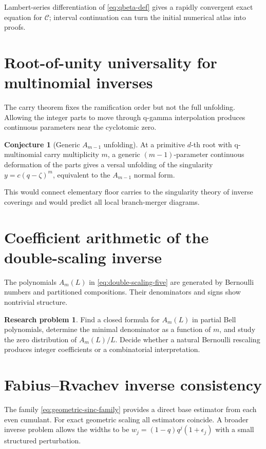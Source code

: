 \documentclass[11pt,letterpaper,oneside,openany]{book}
\theoremstyle{definition}
\newtheorem{researchproblem}{Research problem}[chapter]
\newtheorem{conjecture}{Conjecture}[chapter]
\theoremstyle{remark}
\begin{document}
Lambert-series differentiation of \cref{eq:qbeta-def} gives a rapidly
convergent exact equation for \(\mathcal C\); interval continuation can turn the
initial numerical atlas into proofs.

\section{Root-of-unity universality for multinomial inverses}
The carry theorem fixes the ramification order but not the full unfolding.
Allowing the integer parts to move through q-gamma interpolation produces
continuous parameters near the cyclotomic zero.

\begin{conjecture}[Generic \(A_{m-1}\) unfolding]
At a primitive \(d\)-th root with q-multinomial carry multiplicity \(m\), a
generic \((m-1)\)-parameter continuous deformation of the parts gives a
versal unfolding of the singularity \(y=c(q-\zeta)^m\), equivalent to the
\(A_{m-1}\) normal form.
\end{conjecture}

This would connect elementary floor carries to the singularity theory of
inverse coverings and would predict all local branch-merger diagrams.

\section{Coefficient arithmetic of the double-scaling inverse}
The polynomials \(A_m(L)\) in \cref{eq:double-scaling-five} are generated by
Bernoulli numbers and partitioned compositions.  Their denominators and signs
show nontrivial structure.

\begin{researchproblem}
Find a closed formula for \(A_m(L)\) in partial Bell polynomials, determine the
minimal denominator as a function of \(m\), and study the zero distribution of
\(A_m(L)/L\).  Decide whether a natural Bernoulli rescaling produces integer
coefficients or a combinatorial interpretation.
\end{researchproblem}

\section{Fabius--Rvachev inverse consistency}
The family \cref{eq:geometric-sinc-family} provides a direct base estimator
from each even cumulant.  For exact geometric scaling all estimators coincide.
A broader inverse problem allows the widths to be
\(w_j=(1-q)q^j(1+\epsilon_j)\) with a small structured perturbation.
\end{document}
